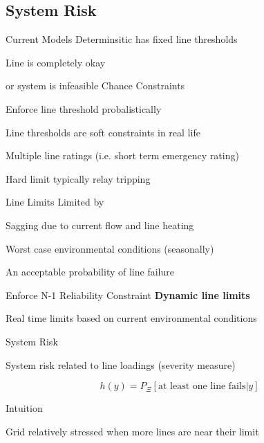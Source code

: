 
\subsection{System Risk}
\begin{frame}{Current Models}
Determinsitic has fixed line thresholds
\bi
\item Line is completely okay
\item or system is infeasible
\ei
\pause
Chance Constraints
\bi
\item Enforce line threshold probalistically
\ei
\pause

\alert{Line thresholds are soft constraints in real life}
\pause
\bi
\item Multiple line ratings (i.e. short term emergency rating)
\item Hard limit typically relay tripping
\ei
\end{frame}

\begin{frame}{Line Limits}
Limited by
\bi
\item Sagging due to current flow and line heating
\item \alert<2>{Worst case environmental conditions (seasonally)}
\item An acceptable probability of line failure
\item Enforce N-1 Reliability Constraint
\ei
\bigskip
\pause
\textbf{Dynamic line limits}
\bi
\item Real time limits based on current environmental conditions
\ei

\end{frame}

\begin{frame}{System Risk}

System risk related to line loadings (severity measure) \footnotemark
\pause


\begin{equation*}
 h(y) = P_\Xi \left[ \mbox{at least one line fails} | y \right] 
\end{equation*}
\EBR
\pause

\vspace{10pt}
Intuition
\bi
\item Grid relatively stressed when more lines are near their limit
\ei
\end{frame}

